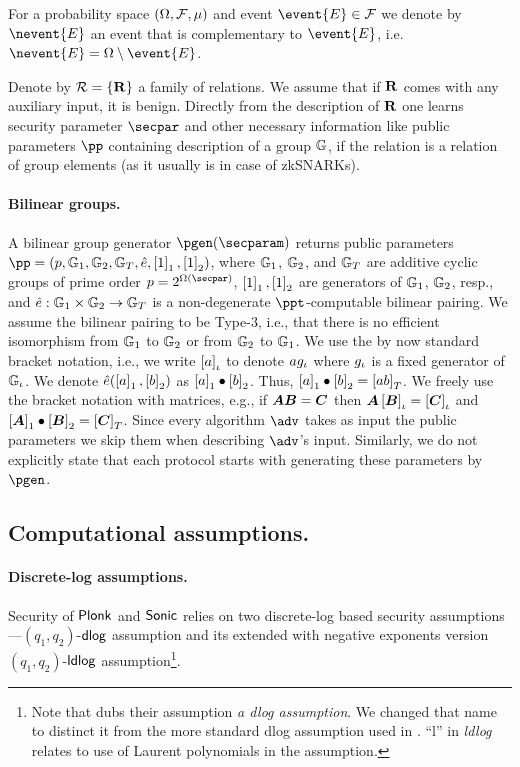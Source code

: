 \documentclass[runningheads,11pt]{llncs}
\def\vec#1{\mathchoice{\mbox{\boldmath$\displaystyle#1$}}
{\mbox{\boldmath$\textstyle#1$}} {\mbox{\boldmath$\scriptstyle#1$}}
{\mbox{\boldmath$\scriptscriptstyle#1$}}}
\theoremstyle{definition} \newtheorem{definition}[theorem]{Definition}
\begin{document}
For a probability space $(\Omega, \mathcal{F}, \mu)$ and event
$\event{E} \in \eventspace$ we denote by $\nevent{E}$ an event that is
complementary to $\event{E}$,
i.e.~$\nevent{E} = \samplespace \setminus \event{E}$.

Denote by $\mathcal{R} = \{\mathbf{R}\}$ a family of relations. We assume that if
$\mathbf{R}$ comes with any auxiliary input, it is benign. Directly from the
description of $\mathbf{R}$ one learns security parameter $\secpar$ and other
necessary information like public parameters $\pp$ containing description of a
group $\mathbb{G}$, if the relation is a relation of group elements (as it usually is
in case of zkSNARKs).

\paragraph{Bilinear groups.}
A bilinear group generator $\pgen (\secparam)$ returns public parameters $ \pp =
(p, \GRP_1, \GRP_2, \GRP_T, \pair, \gone{1}, \gtwo{1})$, where $\mathbb{G}_1$,
$\mathbb{G}_2$, and $\mathbb{G}_T$ are additive cyclic groups of prime order $p = 2^{\Omega
  (\secpar)}$, $\left[1\right]_{1}, \left[1\right]_{2}$ are generators of $\mathbb{G}_1$, $\mathbb{G}_2$, resp.,
and $\hat{e}: \mathbb{G}_1 \times \mathbb{G}_2 \to \mathbb{G}_T$ is a non-degenerate
$\ppt$-computable bilinear pairing. We assume the bilinear pairing to be Type-3,
i.e., that there is no efficient isomorphism from $\mathbb{G}_1$ to $\mathbb{G}_2$ or from
$\mathbb{G}_2$ to $\mathbb{G}_1$. We use the by now standard bracket notation, i.e., we
write $\left[a\right]_{\iota}$ to denote $a g_{\iota}$ where $g_{\iota}$ is a fixed generator
of $\mathbb{G}_{\iota}$. We denote $\hat{e} (\left[a\right]_{1}, \left[b\right]_{2})$ as $\left[a\right]_{1} \bullet
\left[b\right]_{2}$. Thus, $\left[a\right]_{1} \bullet \left[b\right]_{2} = \left[a b\right]_{T}$. We freely use the
bracket notation with matrices, e.g., if $\vec{A} \vec{B} = \vec{C}$ then
$\vec{A} \grpgi{\vec{B}} = \grpgi{\vec{C}}$ and $\gone{\vec{A}}\bullet
\gtwo{\vec{B}} = \gtar{\vec{C}}$. Since every algorithm $\adv$ takes as input
the public parameters we skip them when describing $\adv$'s input. Similarly, we
do not explicitly state that each protocol starts with generating these
parameters by $\pgen$.

\subsection{Computational assumptions.}

\paragraph{Discrete-log assumptions.}
Security of $\textnormal{\textsf{Plonk}}$ and ${\textnormal{\textsf{Sonic}}}$ relies on two discrete-log based security
assumptions---$(q_1, q_2)$-$\mathsf{dlog}$ assumption and its extended with negative
exponents version $(q_1, q_2)$-$\mathsf{ldlog}$ assumption\footnote{Note that
  \cite{CCS:MBKM19} dubs their assumption \emph{a dlog assumption}. We changed
  that name to distinct it from the more standard dlog assumption used in
  \cite{EPRINT:GabWilCio19}. ``l'' in \emph{ldlog} relates to use of Laurent
  polynomials in the assumption.}.
\end{document}
